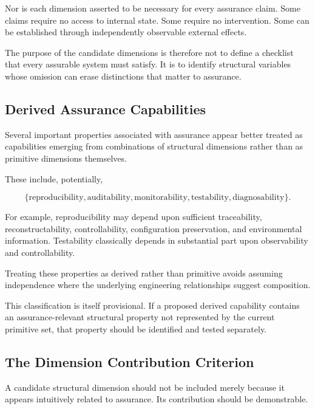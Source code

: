 Nor is each dimension asserted to be necessary for every assurance claim.
Some claims require no access to internal state.
Some require no intervention.
Some can be established through independently observable external effects.

The purpose of the candidate dimensions is therefore not to define
a checklist that every assurable system must satisfy.
It is to identify structural variables whose omission can erase
distinctions that matter to assurance.

\subsection{Derived Assurance Capabilities}
\label{aa.subsec.derived-capabilities}

Several important properties associated with assurance appear better
treated as capabilities emerging from combinations of structural
dimensions rather than as primitive dimensions themselves.

These include, potentially,

\begin{equation}
  \{
  \text{reproducibility},
  \text{auditability},
  \text{monitorability},
  \text{testability},
  \text{diagnosability}
  \}.
\end{equation}

For example, reproducibility may depend upon sufficient traceability,
reconstructability, controllability, configuration preservation,
and environmental information.
Testability classically depends in substantial part upon observability
and controllability.

Treating these properties as derived rather than primitive avoids
assuming independence where the underlying engineering relationships
suggest composition.

This classification is itself provisional.
If a proposed derived capability contains an assurance-relevant
structural property not represented by the current primitive set,
that property should be identified and tested separately.

\subsection{The Dimension Contribution Criterion}
\label{aa.subsec.dimension-contribution}

A candidate structural dimension should not be included merely
because it appears intuitively related to assurance.
Its contribution should be demonstrable.

